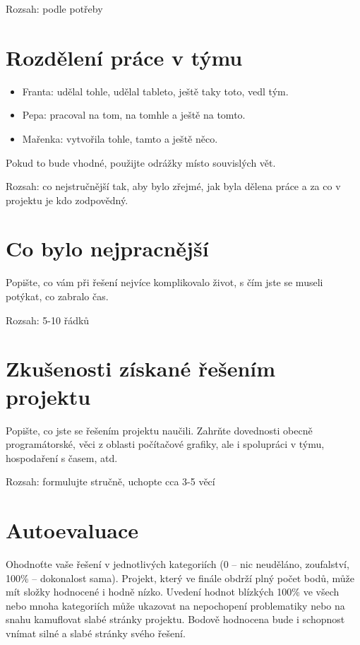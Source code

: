 \documentclass[11pt,a4paper]{article}
\begin{document}
Rozsah: podle potřeby 

\section{Rozdělení práce v týmu}

\begin{itemize}
\item Franta: udělal tohle, udělal tableto, ještě taky toto, vedl tým.
\item Pepa: pracoval na tom, na tomhle a ještě na tomto.
\item Mařenka: vytvořila tohle, tamto a ještě něco.
\end{itemize}
Pokud to bude vhodné, použijte odrážky místo souvislých vět.

Rozsah: co nejstručnější tak, aby bylo zřejmé, jak byla dělena práce a za co v
projektu je kdo zodpovědný.

\section{Co bylo nejpracnější}

Popište, co vám při řešení nejvíce komplikovalo život, s čím jste se museli
potýkat, co zabralo čas.

Rozsah: 5-10 řádků

\section{Zkušenosti získané řešením projektu}

Popište, co jste se řešením projektu naučili. Zahrňte dovednosti obecně
programátorské, věci z oblasti počítačové grafiky, ale i spolupráci v týmu,
hospodaření s časem, atd.

Rozsah: formulujte stručně, uchopte cca 3-5 věcí

\section{Autoevaluace}

Ohodnoťte vaše řešení v jednotlivých kategoriích (0 – nic neuděláno,
zoufalství, 100\% – dokonalost sama). Projekt, který ve finále obdrží plný
počet bodů, může mít složky hodnocené i hodně nízko. Uvedení hodnot blízkých
100\% ve všech nebo mnoha kategoriích může ukazovat na nepochopení problematiky
nebo na snahu kamuflovat slabé stránky projektu. Bodově hodnocena bude i
schopnost vnímat silné a slabé stránky svého řešení.
\end{document}
